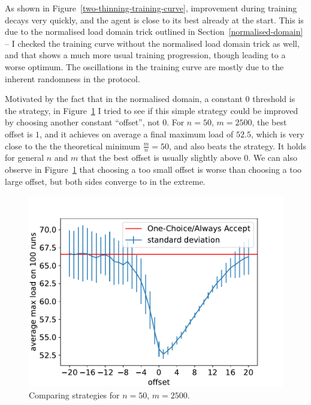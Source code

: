 As shown in Figure~\ref{two-thinning-training-curve}, improvement during training decays very quickly, and the agent is close to its best already at the start. This is due to the normalised load domain trick outlined in Section~\ref{normalised-domain} -- I checked the training curve without the normalised load domain trick as well, and that shows a much more usual training progression, though leading to a worse optimum. The oscillations in the training curve are mostly due to the inherent randomness in the protocol.


Motivated by the fact that in the normalised domain, a constant $0$ threshold is the \MeanThinning strategy, in Figure~\ref{two-thinning-constant-offset} I tried to see if this simple \MeanThinning strategy could be improved by choosing another constant ``offset'', not $0$. For $n=50$, $m=2500$, the best offset is $1$, and it achieves on average a final maximum load of $52.5$, which is very close to the the theoretical minimum $\frac{m}{n}=50$, and also beats the \DQN strategy. It holds for general $n$ and $m$ that the best offset is usually slightly above $0$. We can also observe in Figure~\ref{two-thinning-constant-offset} that choosing a too small offset is worse than choosing a too large offset, but both sides converge to \OneChoice in the extreme.

\begin{figure}[h]
    \centering
    \includegraphics[scale=0.6]{Chapter4/Figs/offset_analysis_50_2500.pdf}
    \caption{Comparing \ConstantOffset strategies for $n=50$, $m=2500$.}
    \label{two-thinning-constant-offset}
\end{figure}



